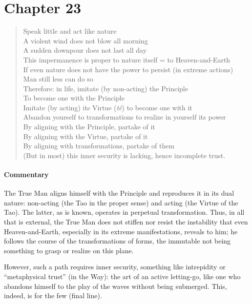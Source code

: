 \section{Chapter 23}

\begin{verse}
Speak little and act like nature\\ A violent wind does not blow all morning\\ A sudden downpour does not last all day\\ 
This impermanence is proper to nature itself = to Heaven-and-Earth \\ 
If even nature does not have the power to persist (in extreme actions)\\ 
Man still less can do so\\ 
Therefore: in life, imitate (by non-acting) the Principle\\ 
To become one with the Principle\\ 
Imitate (by acting) its Virtue (\emph{tê}) to become one with it\\ 
Abandon yourself to transformations to realize in yourself its power\\ 
By aligning with the Principle, partake of it\\ 
By aligning with the Virtue, partake of it\\ 
By aligning with transformations, partake of them\\ 
(But in most) this inner security is lacking, hence incomplete trust.
\end{verse}

\paragraph{Commentary}


The True Man aligns himself with the Principle and reproduces it in its dual nature: non-acting (the Tao in the proper sense) and acting (the Virtue of the Tao). The latter, as is known, operates in perpetual transformation. Thus, in all that is external, the True Man does not stiffen nor resist the instability that even Heaven-and-Earth, especially in its extreme manifestations, reveals to him; he follows the course of the transformations of forms, the immutable not being something to grasp or realize on this plane.

However, such a path requires inner security, something like intrepidity or ``metaphysical trust'' (in the Way): the art of an active letting-go, like one who abandons himself to the play of the waves without being submerged. This, indeed, is for the few (final line).

